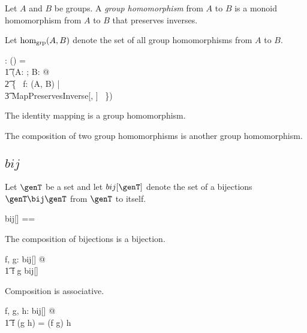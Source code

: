 \documentclass{amsart}
\begin{document}
Let $A$ and $B$ be groups.
A {\em group homomorphism} from $A$ to $B$ is a monoid homomorphism
from $A$ to $B$ that preserves inverses.

Let $\operatorname{hom_{grp}}(A, B)$ denote the set of all group homomorphisms from $A$ to $B$.

\begin{gendef}[\genT, \genU]
\homGroup: \group \genT \cross \group \genU \fun \power (\genT \fun \genU)
\where
\homGroup = \\
\t1	(\lambda A: \group \genT; B: \group \genU @ \\
\t2		\{~ f: \homMonoid(A, B) | \\
\t3			MapPreservesInverse[\genT, \genU] ~\})
\end{gendef}

\begin{remark}
The identity mapping is a group homomorphism.
\end{remark}

\begin{remark}
The composition of two group homomorphisms is another group homomorphism.
\end{remark}

\subsection{$bij$}

Let $\genT$ be a set and let $bij[\genT]$ denote the set of a bijections $\genT \bij \genT$ from $\genT$ to itself.

\begin{zed}
	bij[\genT] == \genT \bij \genT
\end{zed}

\begin{remark}
The composition of bijections is a bijection.

\begin{zed}
	\forall f, g: bij[\setT] @ \\
	\t1	f \circ g \in bij[\setT]
\end{zed}

\end{remark}

\begin{remark}
Composition is associative.

\begin{zed}
	\forall f, g, h: bij[\setT] @ \\
	\t1	f \circ (g \circ h) = (f \circ g) \circ h
\end{zed}

\end{remark}
\end{document}
